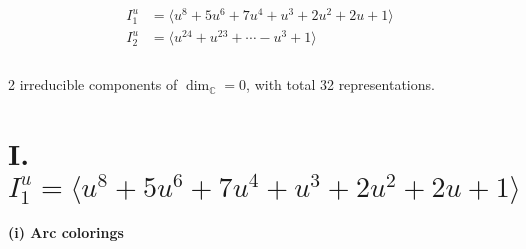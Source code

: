 \documentclass[1p]{elsarticle_modified}
\theoremstyle{definition}
\begin{document}
\begin{align*}
I^u_{1}&=\langle 
u^8+5 u^6+7 u^4+u^3+2 u^2+2 u+1\rangle \\
I^u_{2}&=\langle 
u^{24}+u^{23}+\cdots- u^3+1\rangle \\
\\
\end{align*}
\raggedright * 2 irreducible components of $\dim_{\mathbb{C}}=0$, with total 32 representations.\\
\newpage
\renewcommand{\arraystretch}{1}
\centering \section*{I. $I^u_{1}= \langle u^8+5 u^6+7 u^4+u^3+2 u^2+2 u+1 \rangle$}
\flushleft \textbf{(i) Arc colorings}\\
\end{document}
